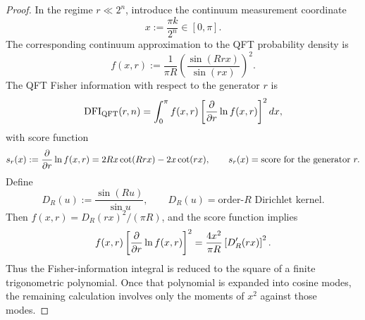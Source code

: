 \begin{proof}
    In the regime $r \ll 2^n$, introduce the continuum measurement coordinate
    \begin{equation}
        x:=\frac{\pi k}{2^n}\in[0,\pi].
    \end{equation}
    The corresponding continuum approximation to the QFT probability density is
    \begin{equation}
        f(x,r):=
        \frac{1}{\pi R}
        \left(
            \frac{\sin(Rrx)}{\sin(rx)}
        \right)^2.
    \end{equation}
    The QFT Fisher information with respect to the generator $r$ is
    \begin{equation}
        \mathrm{DFI}_{\mathrm{QFT}}(r,n)
        =
        \int_{0}^{\pi}
        f(x,r)
        \left[
            \pdv{}{r}\ln f(x, r)
        \right]^2
        dx,
    \end{equation}
    with score function
    \begin{equation}
        s_r(x)
        :=
        \pdv{}{r}\ln f(x,r)
        =
        2Rx\cot(Rrx)-2x\cot(rx),
        \qquad
        s_r(x)=\text{score for the generator }r.
    \end{equation}
    Define
    \begin{equation}
        D_R(u) := \frac{\sin(Ru)}{\sin u},
        \qquad
        D_R(u)=\text{order-}R\text{ Dirichlet kernel}.
    \end{equation}
    Then $f(x, r)=D_R(rx)^2/(\pi R)$, and the score function implies
    \begin{equation}
        f(x, r)\left[\pdv{}{r}\ln f(x, r)\right]^2
        =
        \frac{4x^2}{\pi R}\left[D_R'(rx)\right]^2.
    \end{equation}
    Thus the Fisher-information integral is reduced to the square of a finite trigonometric polynomial. Once that polynomial is expanded into cosine modes, the remaining calculation involves only the moments of $x^2$ against those modes.



\end{proof}
